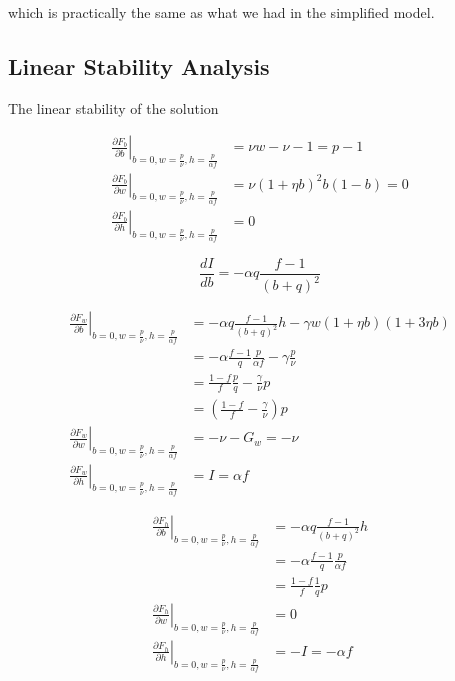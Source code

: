 which is practically the same as what we had in the simplified model.

\subsection{Linear Stability Analysis}

The linear stability of the solution

\begin{align*}
\left.\frac{\partial F_{b}}{\partial b}\right|_{b=0,w=\frac{p}{\nu},h=\frac{p}{\alpha f}} & =\nu w-\nu-1=p-1\\
\left.\frac{\partial F_{b}}{\partial w}\right|_{b=0,w=\frac{p}{\nu},h=\frac{p}{\alpha f}} & =\nu\left(1+\eta b\right)^{2}b\left(1-b\right)=0\\
\left.\frac{\partial F_{b}}{\partial h}\right|_{b=0,w=\frac{p}{\nu},h=\frac{p}{\alpha f}} & =0
\end{align*}

\[
\frac{dI}{db}=-\alpha q\frac{f-1}{\left(b+q\right)^{2}}
\]

\begin{align*}
\left.\frac{\partial F_{w}}{\partial b}\right|_{b=0,w=\frac{p}{\nu},h=\frac{p}{\alpha f}} & =-\alpha q\frac{f-1}{\left(b+q\right)^{2}}h-\gamma w\left(1+\eta b\right)\left(1+3\eta b\right)\\
 & =-\alpha\frac{f-1}{q}\frac{p}{\alpha f}-\gamma\frac{p}{\nu}\\
 & =\frac{1-f}{f}\frac{p}{q}-\frac{\gamma}{\nu}p\\
 & =\left(\frac{1-f}{f}-\frac{\gamma}{\nu}\right)p\\
\left.\frac{\partial F_{w}}{\partial w}\right|_{b=0,w=\frac{p}{\nu},h=\frac{p}{\alpha f}} & =-\nu-G_{w}=-\nu\\
\left.\frac{\partial F_{w}}{\partial h}\right|_{b=0,w=\frac{p}{\nu},h=\frac{p}{\alpha f}} & =I=\alpha f
\end{align*}

\begin{align*}
\left.\frac{\partial F_{h}}{\partial b}\right|_{b=0,w=\frac{p}{\nu},h=\frac{p}{\alpha f}} & =-\alpha q\frac{f-1}{\left(b+q\right)^{2}}h\\
 & =-\alpha\frac{f-1}{q}\frac{p}{\alpha f}\\
 & =\frac{1-f}{f}\frac{1}{q}p\\
\left.\frac{\partial F_{h}}{\partial w}\right|_{b=0,w=\frac{p}{\nu},h=\frac{p}{\alpha f}} & =0\\
\left.\frac{\partial F_{h}}{\partial h}\right|_{b=0,w=\frac{p}{\nu},h=\frac{p}{\alpha f}} & =-I=-\alpha f
\end{align*}

